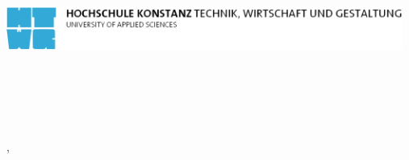 \begin{titlepage}

\includegraphics[width=13cm]{images/cover/htwg_logo.pdf} \\[0.5cm]
\\[3.5cm]
\begin{center}	

	\Huge{
	
		\textbf{\thema} \\[9.5cm]
	}
	
	
	\LARGE{
		\textbf{\autor}\\
	}
	\autorMatNr \\
		
	\LARGE{
		\ort, \abgabedatum \\[1.5cm]
	}
	
	\Huge{
		\textbf{\ausarbeitung}
	}

\end{center}

\end{titlepage}